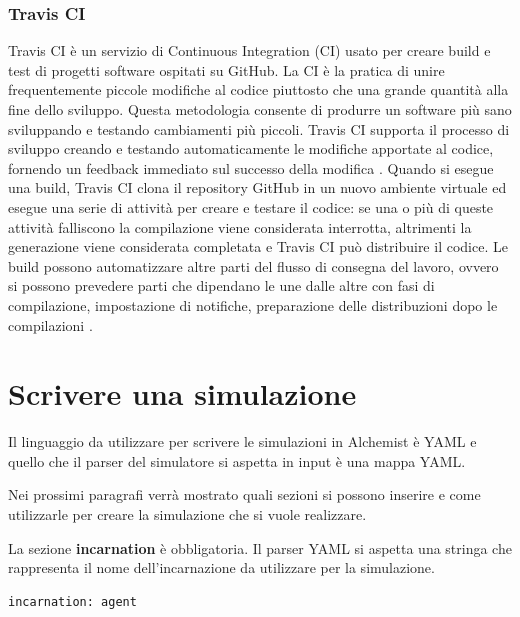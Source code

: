 \subsubsection{Travis CI}
Travis CI è un servizio di Continuous Integration (CI) usato per creare build e test di progetti software ospitati su GitHub.
La CI è la pratica di unire frequentemente piccole modifiche al codice piuttosto che una grande quantità alla fine dello sviluppo. Questa metodologia consente di produrre un software più sano sviluppando e testando cambiamenti più piccoli.
Travis CI supporta il processo di sviluppo creando e testando automaticamente le modifiche apportate al codice, fornendo un feedback immediato sul successo della modifica \cite{TravisCI}.
Quando si esegue una build, Travis CI clona il repository GitHub in un nuovo ambiente virtuale ed esegue una serie di attività per creare e testare il codice: se una o più di queste attività falliscono la compilazione viene considerata interrotta, altrimenti la generazione viene considerata completata e Travis CI può distribuire il codice.
Le build possono automatizzare altre parti del flusso di consegna del lavoro, ovvero si possono prevedere parti che dipendano le une dalle altre con fasi di compilazione, impostazione di notifiche, preparazione delle distribuzioni dopo le compilazioni \cite{TravisCI}.



\section{Scrivere una simulazione}\label{sctn:ScrivereUnaSimulazione}
\lstset{
  basicstyle=\ttfamily,
  captionpos=b,
  numbers=none,
  frame=tb,
}
Il linguaggio da utilizzare per scrivere le simulazioni in Alchemist è YAML e quello che il parser del simulatore si aspetta in input è una mappa YAML.

Nei prossimi paragrafi verrà mostrato quali sezioni si possono inserire e come utilizzarle per creare la simulazione che si vuole realizzare.

La sezione \textbf{incarnation} è obbligatoria. Il parser YAML si aspetta una stringa che rappresenta il nome dell'incarnazione da utilizzare per la simulazione.
\medskip
\begin{lstlisting}[firstnumber=last, caption={Incarnazione}]
  incarnation: agent
\end{lstlisting}

